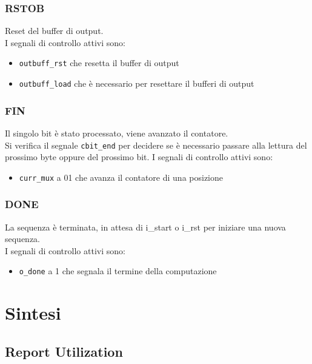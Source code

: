 \documentclass[12pt, a4paper]{article}
\begin{document}
\subsubsection{RSTOB}
Reset del buffer di output.\\
I segnali di controllo attivi sono:
\begin{itemize}
    \item \texttt{outbuff\_rst} che resetta il buffer di output
    \item \texttt{outbuff\_load} che è necessario per resettare il bufferi di output
\end{itemize}

\subsubsection{FIN}
Il singolo bit è stato processato, viene avanzato il contatore.\\
Si verifica il segnale \texttt{cbit\_end} per decidere se è necessario passare alla lettura del
prossimo byte oppure del prossimo bit.
I segnali di controllo attivi sono:
\begin{itemize}
    \item \texttt{curr\_mux} a 01 che avanza il contatore di una posizione
\end{itemize}

\subsubsection{DONE}
La sequenza è terminata, in attesa di i\_start o i\_rst per iniziare una nuova sequenza.\\
I segnali di controllo attivi sono:
\begin{itemize}
    \item \texttt{o\_done} a 1 che segnala il termine della computazione
\end{itemize}

\pagebreak

\section{Sintesi}

\subsection{Report Utilization}
\end{document}
